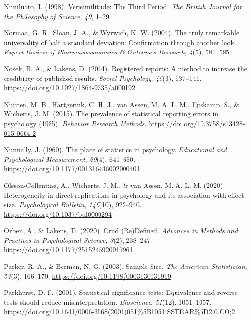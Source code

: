 \documentclass[
  letterpaper,
  DIV=11,
  numbers=noendperiod]{scrreprt}
\newlength{\cslhangindent}
\newlength{\cslentryspacingunit} %
\newenvironment{CSLReferences}[2] %
 {%
  \setlength{\parindent}{0pt}
  \ifodd #1
  \let\oldpar\par
  \def\par{\hangindent=\cslhangindent\oldpar}
  \fi
  \setlength{\parskip}{#2\cslentryspacingunit}
 }%
 {}
\begin{document}
\begin{CSLReferences}{1}{0}
\leavevmode{}%
Niiniluoto, I. (1998). Verisimilitude: {The Third Period}. \emph{The
British Journal for the Philosophy of Science}, \emph{49}, 1--29.

\leavevmode{}%
Norman, G. R., Sloan, J. A., \& Wyrwich, K. W. (2004). The truly
remarkable universality of half a standard deviation: Confirmation
through another look. \emph{Expert Review of Pharmacoeconomics \&
Outcomes Research}, \emph{4}(5), 581--585.

\leavevmode{}%
Nosek, B. A., \& Lakens, D. (2014). Registered reports: {A} method to
increase the credibility of published results. \emph{Social Psychology},
\emph{45}(3), 137--141. \url{https://doi.org/10.1027/1864-9335/a000192}

\leavevmode{}%
Nuijten, M. B., Hartgerink, C. H. J., van Assen, M. A. L. M., Epskamp,
S., \& Wicherts, J. M. (2015). The prevalence of statistical reporting
errors in psychology (1985). \emph{Behavior Research
Methods}. \url{https://doi.org/10.3758/s13428-015-0664-2}

\leavevmode{}%
Nunnally, J. (1960). The place of statistics in psychology.
\emph{Educational and Psychological Measurement}, \emph{20}(4),
641--650. \url{https://doi.org/10.1177/001316446002000401}

\leavevmode{}%
Olsson-Collentine, A., Wicherts, J. M., \& van Assen, M. A. L. M.
(2020). Heterogeneity in direct replications in psychology and its
association with effect size. \emph{Psychological Bulletin},
\emph{146}(10), 922--940. \url{https://doi.org/10.1037/bul0000294}

\leavevmode{}%
Orben, A., \& Lakens, D. (2020). Crud ({Re}){Defined}. \emph{Advances in
Methods and Practices in Psychological Science}, \emph{3}(2), 238--247.
\url{https://doi.org/10.1177/2515245920917961}

\leavevmode{}%
Parker, R. A., \& Berman, N. G. (2003). Sample {Size}. \emph{The
American Statistician}, \emph{57}(3), 166--170.
\url{https://doi.org/10.1198/0003130031919}

\leavevmode{}%
Parkhurst, D. F. (2001). Statistical significance tests: {Equivalence}
and reverse tests should reduce misinterpretation. \emph{Bioscience},
\emph{51}(12), 1051--1057.
\url{https://doi.org/10.1641/0006-3568(2001)051\%5B1051:SSTEAR\%5D2.0.CO;2}


\end{CSLReferences}
\end{document}

